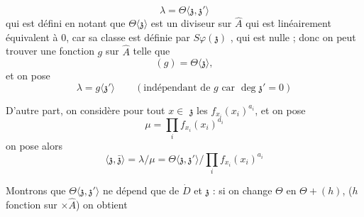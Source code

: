 \documentclass[11pt,a4paper]{article}
\begin{document}

\[
\lambda = \Theta\langle \mathfrak{z}, \mathfrak{z}' \rangle
\]
qui est défini en notant que $\Theta\langle \mathfrak{z} \rangle$ est un
\struck{\ill{}} diviseur sur $\hat{A}$ qui est linéairement équivalent à
$0$, car sa classe est définie par $S\varphi(\mathfrak{z})$ \ill{}, qui
est nulle ; donc on peut  trouver une fonction $g$ sur
$\hat{A}$ telle que
\[
(g) = \Theta\langle \mathfrak{z} \rangle,
\]
et on pose
\[
\lambda = g\langle \mathfrak{z}' \rangle \qquad
(\text{indépendant de } g \text{ car } \deg \mathfrak{z}' = 0)
\]

D'autre part, on considère pour tout $x \in{}$  \ill{}
$\mathfrak{z}$ les  $f_{x_i}(x_i)^{a_i}$, et on
pose
\[
\mu = \prod_i f_{x_i}(x_i)^{a_i}
\]
on pose alors
\[
\langle \mathfrak{z}, \bar{\mathfrak{z}} \rangle = \lambda/\mu =
\Theta\langle \mathfrak{z}, \mathfrak{z}' \rangle \Big/
\prod_i f_{x_i}(x_i)^{a_i}
\]

Montrons que $\Theta\langle \mathfrak{z}, \mathfrak{z}' \rangle$ ne dépend
que de $\dot{D}$ et $\mathfrak{z}$ : si on change $\Theta$ en
$\Theta + (h)$, ($h$ fonction sur  $\times \hat{A}$)
\struck{\ill{}} on obtient
\end{document}
